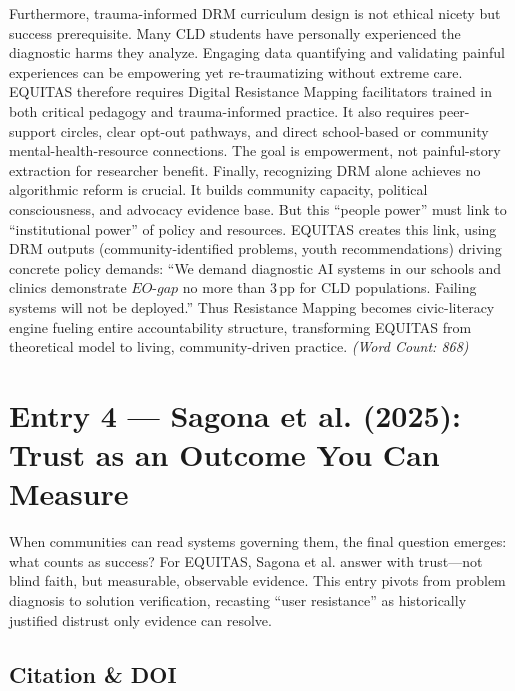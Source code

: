 \documentclass[11pt,twoside]{article}
\DeclareRobustCommand{\EOgap}{EO\text{-}gap\xspace}
\DeclareRobustCommand{\pp}{pp\xspace} %
\begin{document}
Furthermore, trauma-informed DRM curriculum design is not ethical nicety but success prerequisite. Many CLD students have personally experienced the diagnostic harms they analyze. Engaging data quantifying and validating painful experiences can be empowering yet re-traumatizing without extreme care. EQUITAS therefore requires Digital Resistance Mapping facilitators trained in both critical pedagogy and trauma-informed practice. It also requires peer-support circles, clear opt-out pathways, and direct school-based or community mental-health-resource connections. The goal is empowerment, not painful-story extraction for researcher benefit. Finally, recognizing DRM alone achieves no algorithmic reform is crucial. It builds community capacity, political consciousness, and advocacy evidence base. But this ``people power'' must link to ``institutional power'' of policy and resources. EQUITAS creates this link, using DRM outputs (community-identified problems, youth recommendations) driving concrete policy demands: ``We demand diagnostic AI systems in our schools and clinics demonstrate $\EOgap$ no more than 3\,\pp for CLD populations. Failing systems will not be deployed.'' Thus Resistance Mapping becomes civic-literacy engine fueling entire accountability structure, transforming EQUITAS from theoretical model to living, community-driven practice. \textit{(Word Count: 868)}

\newpage

\label{entry4}
\section*{Entry 4 --- Sagona et al. (2025): Trust as an Outcome You Can Measure}

\vspace{-0.3cm}

When communities can read systems governing them, the final question emerges: what counts as success? For \textsc{EQUITAS}, Sagona et al. answer with trust---not blind faith, but measurable, observable evidence. This entry pivots from problem diagnosis to solution verification, recasting ``user resistance'' as historically justified distrust only evidence can resolve.

\vspace{-0.3cm}

\subsection*{Citation \& DOI}
\end{document}
